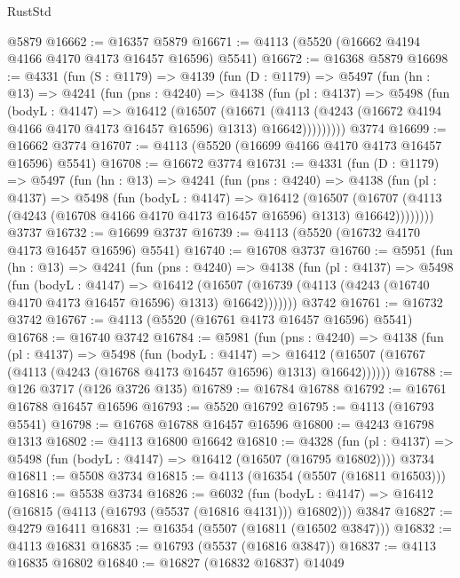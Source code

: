 \begin{lexlean}{RustStd}
\begin{coremodule}
    @5879
@16662 := @16357 @5879
@16671 := @4113 (@5520 (@16662 @4194 @4166 @4170 @4173 @16457 @16596) @5541)
@16672 := @16368 @5879
@16698 := @4331
    (fun (S : @1179) =>
    @4139
      (fun (D : @1179) =>
      @5497
        (fun (hn : @13) =>
        @4241
          (fun (pns : @4240) =>
          @4138
            (fun (pl : @4137) =>
            @5498
              (fun (bodyL : @4147) =>
              @16412
                (@16507
                  (@16671
                    (@4113
                      (@4243 (@16672 @4194 @4166 @4170 @4173 @16457 @16596) @1313)
                      @16642)))))))))
    @3774
@16699 := @16662 @3774
@16707 := @4113 (@5520 (@16699 @4166 @4170 @4173 @16457 @16596) @5541)
@16708 := @16672 @3774
@16731 := @4331
    (fun (D : @1179) =>
    @5497
      (fun (hn : @13) =>
      @4241
        (fun (pns : @4240) =>
        @4138
          (fun (pl : @4137) =>
          @5498
            (fun (bodyL : @4147) =>
            @16412
              (@16507
                (@16707 (@4113 (@4243 (@16708 @4166 @4170 @4173 @16457 @16596) @1313) @16642))))))))
    @3737
@16732 := @16699 @3737
@16739 := @4113 (@5520 (@16732 @4170 @4173 @16457 @16596) @5541)
@16740 := @16708 @3737
@16760 := @5951
    (fun (hn : @13) =>
    @4241
      (fun (pns : @4240) =>
      @4138
        (fun (pl : @4137) =>
        @5498
          (fun (bodyL : @4147) =>
          @16412
            (@16507 (@16739 (@4113 (@4243 (@16740 @4170 @4173 @16457 @16596) @1313) @16642)))))))
    @3742
@16761 := @16732 @3742
@16767 := @4113 (@5520 (@16761 @4173 @16457 @16596) @5541)
@16768 := @16740 @3742
@16784 := @5981
    (fun (pns : @4240) =>
    @4138
      (fun (pl : @4137) =>
      @5498
        (fun (bodyL : @4147) =>
        @16412 (@16507 (@16767 (@4113 (@4243 (@16768 @4173 @16457 @16596) @1313) @16642))))))
@16788 := @126 @3717 (@126 @3726 @135)
@16789 := @16784 @16788
@16792 := @16761 @16788 @16457 @16596
@16793 := @5520 @16792
@16795 := @4113 (@16793 @5541)
@16798 := @16768 @16788 @16457 @16596
@16800 := @4243 @16798 @1313
@16802 := @4113 @16800 @16642
@16810 := @4328
    (fun (pl : @4137) => @5498 (fun (bodyL : @4147) => @16412 (@16507 (@16795 @16802))))
    @3734
@16811 := @5508 @3734
@16815 := @4113 (@16354 (@5507 (@16811 @16503)))
@16816 := @5538 @3734
@16826 := @6032
    (fun (bodyL : @4147) => @16412 (@16815 (@4113 (@16793 (@5537 (@16816 @4131))) @16802)))
    @3847
@16827 := @4279 @16411
@16831 := @16354 (@5507 (@16811 (@16502 @3847)))
@16832 := @4113 @16831
@16835 := @16793 (@5537 (@16816 @3847))
@16837 := @4113 @16835 @16802
@16840 := @16827 (@16832 @16837) @14049

\end{coremodule}
\end{lexlean}
